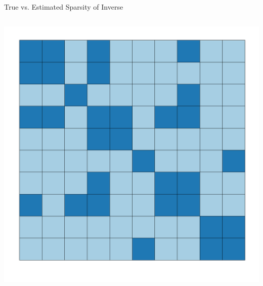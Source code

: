 \documentclass{beamer}
\begin{document}
\begin{frame}{True vs. Estimated Sparsity of Inverse}
\begin{columns}
\begin{column}{0.5\textwidth}
\begin{center}
			\includegraphics[width=\textwidth]{figs/sparse_cov_alpha6.pdf}
		\end{center}
	\end{column}
\end{columns}
\vfill
\end{frame}
\end{document}
